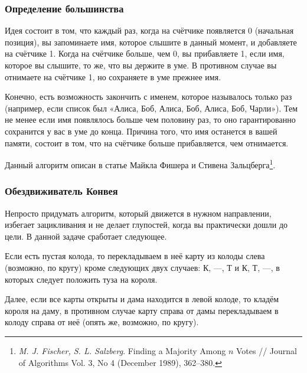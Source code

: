 \documentclass[twoside]{book}
\begin{document}
\subsubsection*{Определение большинства}%

Идея состоит в том, что каждый раз, когда на счётчике появляется 0 (начальная позиция), 
вы запоминаете имя, которое слышите в данный момент, и добавляете на счётчике 1.
Когда на счётчике больше, чем 0, вы прибавляете 1, если имя, которое вы слышите, то же, что вы держите в уме.
В противном случае вы отнимаете на счётчике 1, но сохраняете в уме прежнее имя.

Конечно, есть возможность закончить с именем, которое называлось только раз (например, если список был «Алиса, Боб, Алиса, Боб, Алиса, Боб, Чарли»).
Тем не менее если имя появлялось больше чем половину раз, то оно гарантированно сохранится у вас в уме до конца.
Причина того, что имя останется в вашей памяти, состоит в том, что на счётчике больше прибавляется, чем отнимается.

Данный алгоритм описан в статье Майкла Фишера и Стивена Зальцберга\footnote{\emph{M. J. Fischer, S. L. Salzberg}. Finding a Majority Among $n$ Votes /\!/ {Journal of Algorithms} Vol. 3, No 4 (December 1989),  362--380.}.

\subsubsection*{Обездвиживатель Конвея}%

Непросто придумать алгоритм, который движется в нужном направлении, избегает зацикливания и не делает глупостей, когда вы практически дошли до цели.
В данной задаче сработает следующее.

\medskip

Если есть пустая колода, то перекладываем в неё карту из колоды слева (возможно, по кругу) кроме следующих двух случаев: К, ---, Т и К, Т, ---, в которых следует положить туза на короля.

Далее, если все карты открыты и дама находится в левой колоде, то кладём короля на даму, в противном случае карту справа от дамы перекладываем в колоду справа от неё (опять же, возможно, по кругу).
\end{document}
